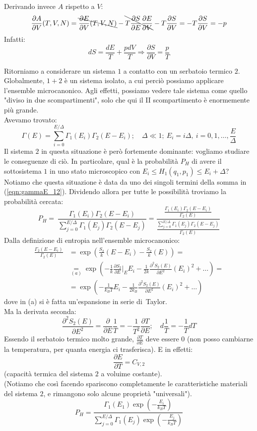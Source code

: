\documentclass[../MeccanicaStatistica.tex]{subfiles}
\begin{document}
Derivando invece $A$ rispetto a $V$:
\[
\frac{\partial A}{\partial V}(T,V,N) = \bcancel{\frac{\partial E}{\partial V}(T,V,N)}-\bcancel{T\frac{\partial S}{\partial E}\frac{\partial E}{\partial V}}-T\frac{\partial S}{\partial V} = -T\frac{\partial S}{\partial V} = -p
\]
Infatti:
\[
dS= \frac{dE}{T}+\frac{p dV}{T} \Rightarrow \frac{\partial S}{\partial V}=\frac{p}{T}
\]

Ritorniamo a considerare un sistema $1$ a contatto con un serbatoio termico $2$. Globalmente, $1+2$ è un sistema isolato, a cui perciò possiamo applicare l'ensemble microcanonico. Agli effetti, possiamo vedere tale sistema come quello "diviso in due scompartimenti", solo che qui il II scompartimento è enormemente più grande.\\
Avevamo trovato:
\begin{equation}
\Gamma(E)=\sum_{i=0}^{E/\Delta}\Gamma_1(E_i)\Gamma_2(E-E_i); \quad \Delta \ll 1; \>E_i=i\Delta,\>i=0,1,\dots,\frac{E}{\Delta}
\label{eqn:gammaE_12}
\end{equation}
Il sistema $2$ in questa situazione è però fortemente dominante: vogliamo studiare le conseguenze di ciò. In particolare, qual è la probabilità $P_H$ di avere il sottosistema $1$ in uno stato microscopico con $E_i\leq H_1(q_1, p_1)\leq E_i+\Delta$? Notiamo che questa situazione è data da uno dei singoli termini della somma in (\ref{eqn:gammaE_12}). Dividendo allora per tutte le possibilità troviamo la probabilità cercata:
\[
P_H =\ \frac{\displaystyle \Gamma_1(E_i)\Gamma_2(E-E_i)}{\displaystyle \sum_{j=0}^{E/\Delta}\Gamma_1(E_j)\Gamma_2(E-E_j)
}
=
\frac{\displaystyle
\frac{\Gamma_1(E_i)\Gamma_2(E-E_i)}{\Gamma_2(E)}
}{
\displaystyle
\frac{\displaystyle \sum_{j=0}^{E/\Delta} \Gamma_1(E_j)\Gamma_2(E-E_j)}{\Gamma_2(E)}
}
\]
Dalla definizione di entropia nell'ensemble microcanonico:
\begin{align*}
\frac{\Gamma_2(E-E_i)}{\Gamma_2(E)}&=\exp\left(
\frac{S_2}{k}(E-E_i)-\frac{S_2}{k}(E)
\right) =\\
&\underset{(a)}{=} 
\exp\left(-\frac{1}{k}\frac{\partial S_2}{\partial E}\big|_E E_i -\frac{1}{2k}\frac{\partial^2 S_2(E)}{\partial E^2}(E_i)^2+\dots \right) =\\
&= \exp\left(-\frac{1}{k_B T}E_i - \frac{1}{2k_B}\frac{\partial^2 S_2(E)}{\partial E^2}(E_i)^2+\dots\right)
\end{align*}
dove in (a) si è fatta un'espansione in serie di\ Taylor.\\
Ma la derivata seconda:
\[
\frac{\partial^2 S_2(E)}{\partial E^2}=\frac{\partial}{\partial E}\frac{1}{T}=-\frac{1}{T^2}\frac{\partial T}{\partial E}; \quad d\frac{1}{T}=-\frac{1}{T}dT
\]
Essendo il serbatoio termico molto grande, $\frac{\partial T}{\partial E}$ deve essere $0$ (non posso cambiarne la temperatura, per quanta energia ci trasferisca). E in effetti:
\[
\frac{\partial E}{\partial T}=C_{V,2}
\]
(capacità termica del sistema $2$ a voluime costante).\\
(Notiamo che così facendo spariscono completamente le caratteristiche materiali del sistema $2$, e rimangono solo alcune proprietà "universali").\\
\[
P_H = \frac{\displaystyle \Gamma_1(E_1) \exp\left(-\frac{E_i}{k_B T}\right )}{\displaystyle \sum_{j=0}^{E/\Delta} \Gamma_1(E_j) \exp\left(-\frac{E_j}{k_B T}\right)}
\]
\end{document}
